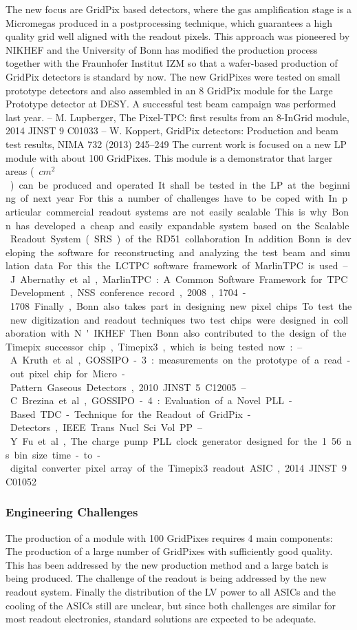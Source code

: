 The new focus are GridPix based detectors, where the gas amplification stage is a Micromegas produced in a postprocessing technique, which guarantees a high quality grid well aligned with the readout pixels. This approach was pioneered by NIKHEF and the University of Bonn has modified the production process together with the Fraunhofer Institut IZM so that a wafer-based production of GridPix detectors is standard by now. The new GridPixes were tested on small prototype detectors and also assembled in an 8 GridPix module for the Large Prototype detector at DESY. A successful test beam campaign was performed last year.
– M. Lupberger, The Pixel-TPC: first results from an 8-InGrid module, 2014 JINST 9 C01033
– W. Koppert, GridPix detectors: Production and beam test results, NIMA 732 (2013) 245–249 The current work is focused on a new LP module with about 100 GridPixes. This module is a demonstrator that larger areas (~\unit[400]{$cm^2$}) can be produced and operated. It shall be tested in the LP at the beginning of next year. For this a number of challenges have to be coped with. In particular commercial readout systems are not easily scalable. This is why Bonn has developed a cheap and easily expandable system based on the Scalable Readout System (SRS) of the RD51 collaboration.
In addition Bonn is developing the software for reconstructing and analyzing the test beam and simulation data. For this the LCTPC software framework of MarlinTPC is used.
– J. Abernathy et al., MarlinTPC: A Common Software Framework for TPC Development, NSS conference record, 2008, 1704-1708
Finally, Bonn also takes part in designing new pixel chips. To test the new digitization and readout techniques two test chips were designed in collaboration with N'IKHEF. Then Bonn also contributed to the design of the Timepix successor chip, Timepix3, which is being tested now:
– A. Kruth et al., GOSSIPO-3: measurements on the prototype of a read-out pixel chip for Micro- Pattern Gaseous Detectors, 2010 JINST 5 C12005
– C. Brezina et al., GOSSIPO-4: Evaluation of a Novel PLL-Based TDC-Technique for the Readout of GridPix-Detectors, IEEE Trans. Nucl. Sci. Vol. PP
– Y. Fu et al., The charge pump PLL clock generator designed for the 1.56 ns bin size time-to-digital converter pixel array of the Timepix3 readout ASIC, 2014 JINST 9 C01052
\subsubsection{Engineering Challenges}
The production of a module with 100 GridPixes requires 4 main components: The production of a
large number of GridPixes with sufficiently good quality. This has been addressed by the new production method and a large batch is being produced. The challenge of the readout is being addressed by the new readout system. Finally the distribution of the LV power to all ASICs and the cooling of the ASICs still are unclear, but since both challenges are similar for most readout electronics, standard solutions are expected to be adequate.

